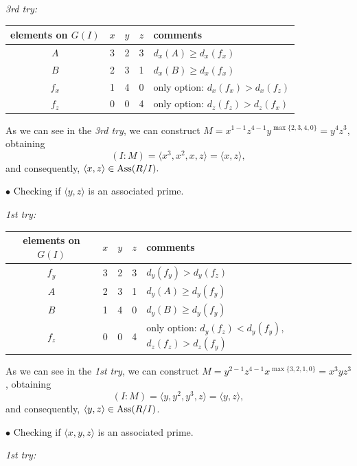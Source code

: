 \documentclass[11pt]{amsart}   %
\begin{document}
\begin{exm}
\medskip

{\em 3rd try:}

\medskip

\begin{tabular}{c|c|c|c|l}
elements on $G(I)$ & $x$ & $y$ & $z$ & comments\\\hline
$A$ & 3 & 2 & 3 & $d_x(A)\geq d_x(f_x)$\\\hline
$B$ & 2 & 3 & 1 & $d_x(B)\geq d_x(f_x)$\\\hline
$f_x$ & 1 & 4 & 0 & only option: $d_x(f_x)>d_x(f_z)$\\\hline
$f_z$ & 0 & 0 & 4& only option: $d_z(f_z)>d_z(f_x)$    
\end{tabular}

\medskip

As we can see in the {\em 3rd try}, we can construct $M=x^{1-1}z^{4-1}y^{\max\{2,3,4,0\}}=y^4z^3$, obtaining $$(I:M)=\langle x^3,x^2,x,z\rangle=\langle x,z\rangle,$$ and consequently, $\langle x,z\rangle\in {\rm Ass}(R/I).$

\medskip

\noindent $\bullet$ Checking if $\langle y,z\rangle$ is an associated prime.

\medskip

{\em 1st try:}

\medskip

\begin{tabular}{c|c|c|c|l}
elements on $G(I)$ & $x$ & $y$ & $z$ & comments\\\hline
$f_y$ & 3 & 2 & 3 & $d_y(f_y)>d_y(f_z)$\\\hline
$A$ & 2 & 3 & 1 & $d_y(A)\geq d_y(f_y)$\\\hline
$B$ & 1 & 4 & 0 & $d_y(B)\geq d_y(f_y)$\\\hline
$f_z$ & 0 & 0 & 4& only option: $d_y(f_z)<d_y(f_y)$, $d_z(f_z)>d_z(f_y)$    
\end{tabular}

\medskip

As we can see in the {\em 1st try}, we can construct $M=y^{2-1}z^{4-1}x^{\max\{3,2,1,0\}}=x^3yz^3$, obtaining $$(I:M)=\langle y,y^2,y^3,z\rangle=\langle y,z\rangle,$$ and consequently, $\langle y,z\rangle\in {\rm Ass}(R/I)$.

\medskip

\noindent $\bullet$ Checking if $\langle x,y,z\rangle$ is an associated prime.

\medskip

{\em 1st try:}

\medskip


\end{exm}
\end{document}

